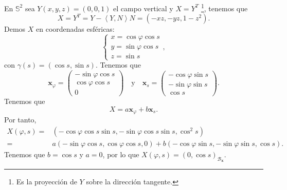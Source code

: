 \begin{eg}[Esfera]
En $\displaystyle \mathbb{S}^{2} $ sea $\displaystyle Y\left(x,y,z\right)=\left(0,0,1\right) $ el campo vertical y $\displaystyle X = Y^{T} $ \footnote{Es la proyección de $\displaystyle Y $ sobre la dirección tangente.}, tenemos que 
\[X = Y^{T} = Y-\left\langle Y, N \right\rangle N = \left(-xz, -yz, 1-z^{2}\right) .\]
Demos $\displaystyle X $ en coordenadas esféricas:
\[
\begin{cases}
x = \cos\varphi \cos s \\
y = \sin\varphi \cos s \\
z = \sin s
\end{cases}
,\]
con $\displaystyle \gamma\left(s\right)=\left(\cos s, \sin s\right) $. Tenemos que 
\[ \textbf{x} _{\varphi}=\begin{pmatrix} -\sin\varphi\cos s \\ \cos \varphi \cos s \\ 0 \end{pmatrix} \quad \text{y} \quad \textbf{x} _{s}=\begin{pmatrix} -\cos\varphi \sin s \\ -\sin \varphi \sin s \\ \cos s \end{pmatrix} .\]
Tenemos que 
\[ X = a \textbf{x} _{\varphi} + b \textbf{x} _{s} .\]
Por tanto, 
\[
\begin{split}
	X\left(\varphi, s\right)= &\left(-\cos\varphi \cos s \sin s, -\sin\varphi \cos s \sin s, \cos ^{2}s\right)\\
	= &  a\left(-\sin \varphi \cos s, \cos \varphi \cos s, 0\right)+ b \left(-\cos \varphi \sin s, -\sin \varphi \sin s, \cos s\right).
\end{split}
\]
Tenemos que $\displaystyle b = \cos s $ y $\displaystyle a = 0 $, por lo que $\displaystyle X\left(\varphi, s\right)=\left(0, \cos s\right)_{\mathcal{B}_{ \textbf{x} }} $. \\


\end{eg}

